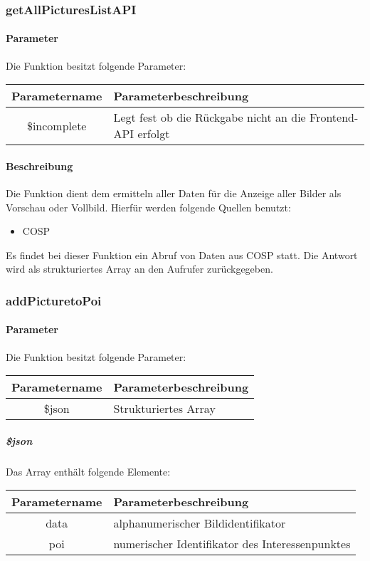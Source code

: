\subsubsection{getAllPicturesListAPI}
\paragraph{Parameter} Die Funktion besitzt folgende Parameter:
\begin{table}[H]
	\begin{tabular}{|c|p{11cm}|}
		\hline
		\textbf{Parametername} & \textbf{Parameterbeschreibung} \\ \hline
		\$incomplete & Legt fest ob die Rückgabe nicht an die Frontend-API erfolgt \\ \hline
	\end{tabular}
\end{table}
\paragraph{Beschreibung} Die Funktion dient dem ermitteln aller Daten für die Anzeige aller Bilder als Vorschau oder Vollbild. Hierfür werden folgende Quellen benutzt:
\begin{itemize}
	\item COSP
\end{itemize}
Es findet bei dieser Funktion ein Abruf von Daten aus {\glqq COSP\grqq} statt. Die Antwort wird als strukturiertes Array an den Aufrufer zurückgegeben.
\subsubsection{addPicturetoPoi}
\paragraph{Parameter} Die Funktion besitzt folgende Parameter:
\begin{table}[H]
	\begin{tabular}{|c|p{11cm}|}
		\hline
		\textbf{Parametername} & \textbf{Parameterbeschreibung} \\ \hline
		\$json & Strukturiertes Array \\ \hline
	\end{tabular}
\end{table}
\subparagraph{\$json}Das Array enthält folgende Elemente:
\begin{table}[H]
	\begin{tabular}{|c|p{11cm}|}
		\hline
		\textbf{Parametername} & \textbf{Parameterbeschreibung} \\ \hline
		data & alphanumerischer Bildidentifikator \\ \hline
		poi  & numerischer Identifikator des Interessenpunktes \\ \hline
	\end{tabular}
\end{table}
